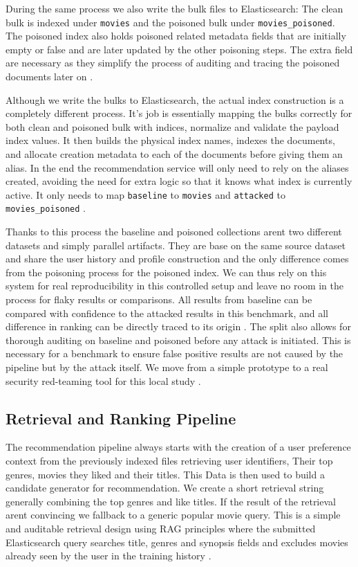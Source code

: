 During the same process we also write the bulk files to Elasticsearch: The clean bulk is indexed under \texttt{movies} and the poisoned bulk under \texttt{movies\_poisoned}. The poisoned index also holds poisoned related metadata fields that are initially empty or false and are later updated by the other poisoning steps. The extra field are necessary as they simplify the process of auditing and tracing the poisoned documents later on \cite{ragpoisonlab_repo,elastic_docs_es}.

Although we write the bulks to Elasticsearch, the actual index construction is a completely different process. It's job is essentially mapping the bulks correctly for both clean and poisoned bulk with indices, normalize and validate the payload index values. It then builds the physical index names, indexes the documents, and allocate creation metadata to each of the documents before giving them an alias. In the end the recommendation service will only need to rely on the aliases created, avoiding the need for extra logic so that it knows what index is currently active. It only needs to map \texttt{baseline} to \texttt{movies} and \texttt{attacked} to \texttt{movies\_poisoned} \cite{ragpoisonlab_repo,elastic_docs_es}.

Thanks to this process the baseline and poisoned collections arent two different datasets and simply parallel artifacts. They are base on the same source dataset and share the user history and profile construction and the only difference comes from the poisoning process for the poisoned index. We can thus rely on this system for real reproducibility in this controlled setup and leave no room in the process for flaky results or comparisons. All results from baseline can be compared with confidence to the attacked results in this benchmark, and all difference in ranking can be directly traced to its origin \cite{ragpoisonlab_repo}.
The split also allows for thorough auditing on baseline and poisoned before any attack is initiated. This is necessary for a benchmark to ensure false positive results are not caused by the pipeline but by the attack itself. We move from a simple prototype to a real security red-teaming tool for this local study \cite{ragpoisonlab_repo,perez2022redteaming,mazeika2024harmbench}.

\subsection{Retrieval and Ranking Pipeline}

The recommendation pipeline always starts with the creation of a user preference context from the previously indexed files retrieving user identifiers, Their top genres, movies they liked and their titles. This Data is then used to build a candidate generator for recommendation. We create a short retrieval string generally combining the top genres and like titles. If the result of the retrieval arent convincing we fallback to a generic popular movie query. This is a simple and auditable retrieval design using RAG principles where the submitted Elasticsearch query searches title, genres and synopsis fields and excludes movies already seen by the user in the training history \cite{ragpoisonlab_repo,lewis2020rag,gao2024ragsurvey,elastic_docs_es}.

